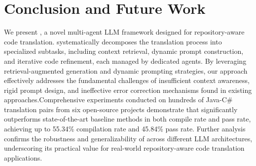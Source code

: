 \section{Conclusion and Future Work}

We present \toolname, a novel multi-agent LLM framework designed for repository-aware code translation. \toolname systematically decomposes the translation process into specialized subtasks, including context retrieval, dynamic prompt construction, and iterative code refinement, each managed by dedicated agents. By leveraging retrieval-augmented generation and dynamic prompting strategies, our approach effectively addresses the fundamental challenges of insufficient context awareness, rigid prompt design, and ineffective error correction mechanisms found in existing approaches.Comprehensive experiments conducted on hundreds of Java-C\# translation pairs from six open-source projects demonstrate that \toolname significantly outperforms state-of-the-art baseline methods in both compile rate and pass rate, achieving up to 55.34\% compilation rate and 45.84\% pass rate. Further analysis confirms the robustness and generalizability of \toolname across different LLM architectures, underscoring its practical value for real-world repository-aware code translation applications.